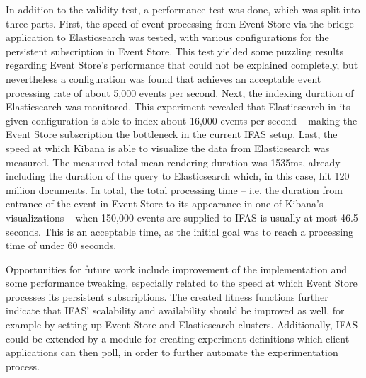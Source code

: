 In addition to the validity test, a performance test was done, which was split into three parts.
First, the speed of event processing from Event Store via the bridge application to Elasticsearch was tested, with various configurations for the persistent subscription in Event Store.
This test yielded some puzzling results regarding Event Store's performance that could not be explained completely, but nevertheless a configuration was found that achieves an acceptable event processing rate of about 5,000 events per second.
Next, the indexing duration of Elasticsearch was monitored.
This experiment revealed that Elasticsearch in its given configuration is able to index about 16,000 events per second -- making the Event Store subscription the bottleneck in the current \ac{IFAS} setup.
Last, the speed at which Kibana is able to visualize the data from Elasticsearch was measured.
The measured total mean rendering duration was 1535ms, already including the duration of the query to Elasticsearch which, in this case, hit 120 million documents.
In total, the total processing time -- i.e. the duration from entrance of the event in Event Store to its appearance in one of Kibana's visualizations -- when 150,000 events are supplied to \ac{IFAS} is usually at most 46.5 seconds.
This is an acceptable time, as the initial goal was to reach a processing time of under 60 seconds.

Opportunities for future work include improvement of the implementation and some performance tweaking, especially related to the speed at which Event Store processes its persistent subscriptions.
The created fitness functions further indicate that \ac{IFAS}' scalability and availability should be improved as well, for example by setting up Event Store and Elasticsearch clusters.
Additionally, \ac{IFAS} could be extended by a module for creating experiment definitions which client applications can then poll, in order to further automate the experimentation process.
